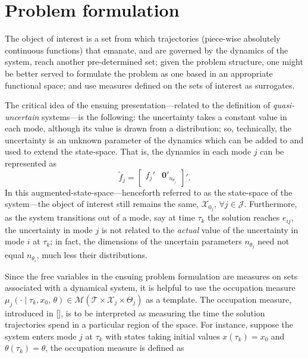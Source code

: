 \section{Problem formulation}
The object of interest is a set from which trajectories (piece-wise absolutely continuous functions) that emanate, and are governed by the dynamics of the system, reach another pre-determined set; given the problem structure, one might be better served to formulate the problem as one based in an appropriate functional space; and use measures defined on the sets of interest as surrogates.
\par
The critical idea of the ensuing presentation---related to the definition of \emph{quasi-uncertain} systems---is the following: the uncertainty takes a constant value in each mode, although its value is drawn from a distribution; so, technically, the uncertainty is an unknown parameter of the dynamics which can be added to and used to extend the state-space. That is, the dynamics in each mode $j$ can be represented as
$$\tilde f_j=\begin{bmatrix}
  f_j'&\mathbf{0}'_{n_{\theta_j}}
\end{bmatrix}'.$$
In this augmented-state-space---henceforth referred to as the state-space of the system---the object of interest still remains the same, $\mathcal X_{0_j},\,\forall j\in \mathcal J$. Furthermore, as the system transitions out of a mode, say at time $\tau_k$ the solution reaches $e_{ij}$, the uncertainty in mode $j$ is not related to the \emph{actual} value of the uncertainty in mode $i$ at $\tau_k$; in fact, the dimensions of the uncertain parameters $n_{\theta_j}$ need not equal $n_{\theta_i}$, much less their distributions.
\par
Since the free variables in the ensuing problem formulation are measures on sets associated with a dynamical system, it is helpful to use the occupation measure \mbox{$\mu_j(\cdot\mid \tau_k,x_0,\,\theta)\in \mathcal M(\mathcal T\times \mathcal X_j\times \Theta_j)$} as a template. The occupation measure, introduced in [], is to be interpreted as measuring the time the solution trajectories spend in a particular region of the space. For instance, suppose the system enters mode $j$ at $\tau_k$ with states taking initial values $x(\tau_k)=x_0$ and $\theta(\tau_k)=\theta$, the occupation measure is defined as


